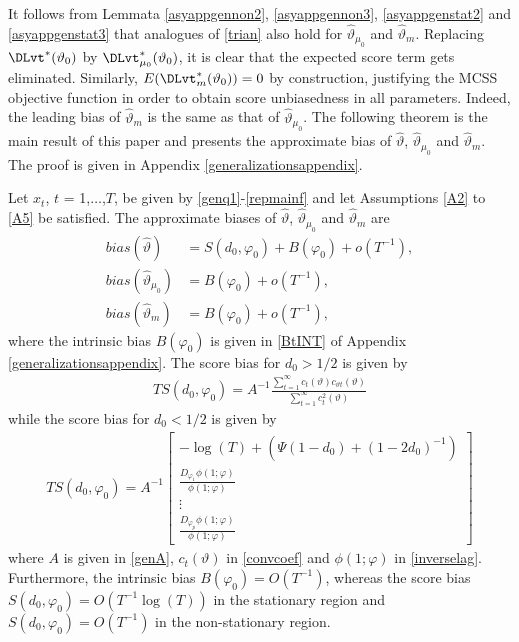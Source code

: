 {{It follows from Lemmata \ref{asyappgennon2}, \ref{asyappgennon3}, \ref{asyappgenstat2} and \ref{asyappgenstat3} that analogues of \eqref{trian} also hold for $\hat{\vartheta}_{\mu_0}$ and $\hat{\vartheta}_m$. Replacing
$\DLvt^*(\vartheta_0)$ by $\DLvt_{\mu_0}^*(\vartheta_0)$, it is clear that the expected score term gets eliminated. Similarly, $E (\DLvt_{m}^*(\vartheta_0)) = 0$ by construction, justifying the MCSS objective function in order to
obtain score unbiasedness in all parameters. Indeed, the leading bias of $\hat{\vartheta}_m$ is the same as that of $\hat{\vartheta}_{\mu_0}$. The following theorem is the main result of this paper and presents the approximate
bias of $\hat{\vartheta}$, $\hat{\vartheta}_{\mu_0}$ and $\hat{\vartheta}_{m}$. The proof is given in Appendix \ref{generalizationsappendix}.
\begin{theorem}\label{t53} 
Let $x_t$, $t$ = 1,$\ldots$,$T$, be given by \eqref{genq1}-\eqref{repmainf} and let Assumptions \ref{A2} to \ref{A5} be satisfied. The approximate biases of $\hat{\vartheta}$, $\hat{\vartheta}_{\mu_0}$ and $\hat{\vartheta}_{m}$ are 
\begin{align}
    bias(\hat{\vartheta}) &= S(d_0,\varphi_0) + B(\varphi_0) + o(T^{-1}), \\
    bias(\hat{\vartheta}_{\mu_0}) &= B(\varphi_0) + o(T^{-1}), \\
    bias(\hat{\vartheta}_{m}) &=  B(\varphi_0) + o(T^{-1}),
\end{align}
where the intrinsic bias $B(\varphi_0)$ is given in \eqref{BtINT} of Appendix \ref{generalizationsappendix}. The score bias for $d_0 > 1/2$ is given by  
\begin{align*}
    TS(d_0,\varphi_0) =  A^{-1} \frac{\sum_{t = 1}^{\infty} c_{t}(\vartheta) c_{\vartheta t}(\vartheta)}{ \sum_{t = 1}^{\infty} c^2_{t}(\vartheta) } 
\end{align*}
while the score bias for $d_0 < 1/2$ is given by 
\begin{align*}
    TS(d_0,\varphi_0) = A^{-1}  \begin{bmatrix}
  -\log(T)+\left(\Psi(1-d_0) + (1-2d_0)^{-1}\right) \\
\frac{D_{\varphi_1 } \phi(1;\varphi)}{ \phi(1;\varphi) } \\
\vdots    \\
\frac{D_{\varphi_p } \phi(1;\varphi)}{ \phi(1;\varphi) }
\end{bmatrix}
\end{align*}
where $A$ is given in \eqref{genA}, $c_{t}(\vartheta)$ in \eqref{convcoef} and  $\phi(1;\varphi)$ in \eqref{inverselag}.  Furthermore, the intrinsic bias $B(\varphi_0) = O(T^{-1})$, whereas the score bias $S(d_0,\varphi_0) = O(T^{-1} \log(T))$ in the stationary region and $S(d_0,\varphi_0) = O(T^{-1})$ in the non-stationary region. 
\end{theorem} 


}}
